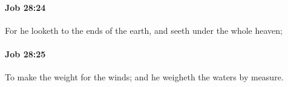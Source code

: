 		\paragraph{Job 28:24} %
			\label{JOB-28-24}

			For he looketh to the ends of the earth, and seeth under the whole heaven;


		\paragraph{Job 28:25} %
			\label{JOB-28-25}

			To make the weight for the winds; and he weigheth the waters by measure.


